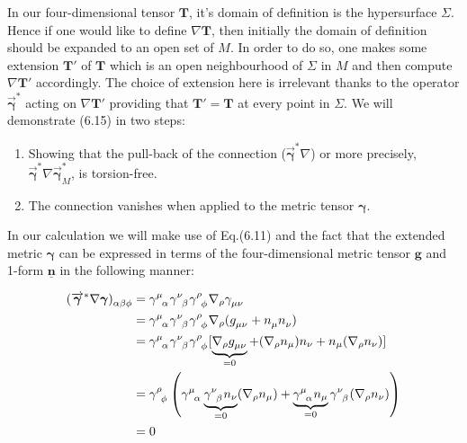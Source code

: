 \documentclass[12pt]{article}
\renewcommand{\vec}[1]{\bm{#1}}
\numberwithin{equation}{section}
\numberwithin{theorem}{subsection}
\begin{document}
In our four-dimensional tensor $\vec{T}$, it's domain of definition is the hypersurface $\Sigma$. Hence if one would like to define $\nabla\vec{T}$, then initially the domain of definition should be expanded to an open set of $M$. In order to do so, one makes some extension $\vec{T'}$ of $\vec{T}$ which is an open neighbourhood of $\Sigma$ in $M$ and then compute $\nabla\vec{T'}$ accordingly. The choice of extension here is irrelevant thanks to the operator $\overrightarrow{\vec{\gamma}}^{*}$ acting on $\nabla\vec{T'}$ providing that $\vec{T'}=\vec{T}$ at every point in $\Sigma$. We will demonstrate (6.15) in two steps: \begin{enumerate}

    \item Showing that the pull-back of the connection ($\overrightarrow{\vec{\gamma}}^{*}\nabla$) or more precisely, $\overrightarrow{\vec{\gamma}}^{*}\nabla\overrightarrow{\vec{\gamma}}^{*}_{M}$, is torsion-free.

    \item The connection vanishes when applied to the metric tensor $\vec{\gamma}$.

\end{enumerate}

In our calculation we will make use of Eq.(6.11) and the fact that the extended metric $\vec{\gamma}$ can be expressed in terms of the four-dimensional metric tensor $\vec{g}$ and 1-form $\underline{\vec{n}}$ in the following manner: 

\begin{align*}

    \tensor{(\overrightarrow{\vec{\gamma}}^{*}\nabla\vec{\gamma})}{_\alpha_\beta_\phi} &= \tensor{\gamma}{^\mu_\alpha}\tensor{\gamma}{^\nu_\beta}\tensor{\gamma}{^\rho_\phi} \nabla_{\rho}\tensor{\gamma}{_\mu_\nu} \\

    &= \tensor{\gamma}{^\mu_\alpha}\tensor{\gamma}{^\nu_\beta}\tensor{\gamma}{^\rho_\phi} \nabla_{\rho}(\tensor{g}{_\mu_\nu} + \tensor{n}{_\mu}\tensor{n}{_\nu}) \\ &= \tensor{\gamma}{^\mu_\alpha}\tensor{\gamma}{^\nu_\beta}\tensor{\gamma}{^\rho_\phi}[\underbrace{\nabla_{\rho}\tensor{g}{_\mu_\nu}}_{= 0}+(\nabla_{\rho}n_{\mu})n_{\nu} + n_{\mu}(\nabla_{\rho}n_{\nu})] \\ &= \tensor{\gamma}{^\rho_\phi} \left( \tensor{\gamma}{^\mu_\alpha} \underbrace{\tensor{\gamma}{^\nu_\beta}n_{\nu}}_{= 0} (\nabla_{\rho}n_{\mu}) + \underbrace{\tensor{\gamma}{^\mu_\alpha}n_{\mu}}_{= 0} \tensor{\gamma}{^\nu_\beta} (\nabla_{\rho}n_{\nu}) \right) \\ &=  0 

\end{align*}
\end{document}

